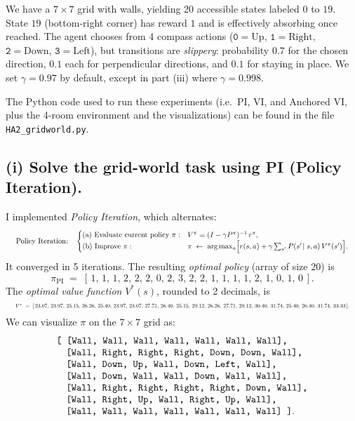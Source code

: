 We have a \(7\times7\) grid with walls, yielding 20 accessible states labeled
\(0\) to \(19\). State \(19\) (bottom-right corner) has reward \(1\) and 
is effectively absorbing once reached. The agent chooses from 4 compass actions 
(\(\mathtt{0}=\text{Up}\), \(\mathtt{1}=\text{Right}\), 
\(\mathtt{2}=\text{Down}\), \(\mathtt{3}=\text{Left}\)), but transitions are 
\emph{slippery}: probability \(0.7\) for the chosen direction, \(0.1\) each 
for perpendicular directions, and \(0.1\) for staying in place. 
We set \(\gamma=0.97\) by default, except in part (iii) where \(\gamma=0.998\).

The Python code used to run these experiments (i.e.\ PI, VI, and Anchored VI, 
plus the 4-room environment and the visualizations) can be found in the file 
\texttt{HA2\_gridworld.py}.

\subsection*{(i) Solve the grid-world task using PI (Policy Iteration).}

\noindent
I implemented \emph{Policy Iteration}, which alternates:
\[
  \resizebox{\textwidth}{!}{
  $\text{Policy Iteration:}\quad
  \begin{cases}
    \text{(a) Evaluate current policy }\pi: 
      & V^\pi = (I - \gamma P^\pi)^{-1} \, r^\pi,\\
    \text{(b) Improve } \pi: & 
      \pi \;\gets\; \arg\max_{a} 
        \Bigl[r(s,a) + \gamma\sum_{s'}P(s'\!\mid s,a)\,V^\pi(s')\Bigr].
  \end{cases}$
  }
\]
It converged in 5 iterations. The resulting \emph{optimal policy} (array of size 20) is
\[
  \pi_{\mathrm{PI}} \;=\; 
  [\,1,\,1,\,1,\,2,\,2,\,2,\,0,\,2,\,3,\,2,\,2,\,1,\,1,\,1,\,1,\,2,\,1,\,0,\,1,\,0\,].
\]
The \emph{optimal value function} \(V^*(s)\), rounded to 2 decimals, is
\[
  \resizebox{\textwidth}{!}{
  $V^* \;=\;
  [\,23.07,\,23.97,\,25.15,\,26.26,\,25.40,\,23.97,\,23.07,\,27.71,\,26.40,\,25.15,\,
    29.12,\,26.26,\,27.71,\,29.12,\,30.40,\,31.74,\,25.40,\,26.40,\,31.74,\,33.33\,].$
  }
\]
We can visualize \(\pi\) on the \(7\times7\) grid as:
\[
\begin{array}{l}
\text{\ttfamily
[ [Wall,  Wall,  Wall,  Wall,  Wall,  Wall,  Wall],}\\
\quad \text{\ttfamily [Wall, Right, Right, Right, Down, Down, Wall],}\\
\quad \text{\ttfamily [Wall, Down,  Up,   Wall,  Down, Left,  Wall],}\\
\quad \text{\ttfamily [Wall, Down,  Wall, Wall,  Down, Wall,  Wall],}\\
\quad \text{\ttfamily [Wall, Right, Right, Right, Right, Down, Wall],}\\
\quad \text{\ttfamily [Wall, Right, Up,    Wall, Right, Up,   Wall],}\\
\quad \text{\ttfamily [Wall, Wall,  Wall,  Wall, Wall,  Wall,  Wall] ]}.
\end{array}
\]

